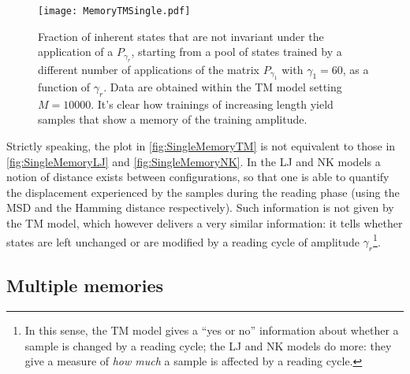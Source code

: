 \begin{figure} 
\centering 
\texttt{[image: MemoryTMSingle.pdf]} 
\caption{Fraction of inherent states that are not invariant under the application of a $P_{\gamma_{r}}$, starting from a pool of states trained by a different number of applications of the matrix $P_{\gamma_{1}}$ with $\gamma_{1} = 60$, as a function of $\gamma_{r}$. Data are obtained within the TM model setting $M=10000$. It's clear how trainings of increasing length yield samples that show a memory of the training amplitude. \label{fig:SingleMemoryTM}}
\end{figure}

Strictly speaking, the plot in \autoref{fig:SingleMemoryTM} is not equivalent to those in \autoref{fig:SingleMemoryLJ} and \autoref{fig:SingleMemoryNK}. In the LJ and NK models a notion of distance exists between configurations, so that one is able to quantify the displacement experienced by the samples during the reading phase (using the MSD and the Hamming distance respectively). Such information is not given by the TM model, which however delivers a very similar information: it tells whether states are left unchanged or are modified by a reading cycle of amplitude $\gamma_{r}$\footnote{In this sense, the TM model gives a ``yes or no'' information about whether a sample is changed by a reading cycle; the LJ and NK models do more: they give a measure of \emph{how much} a sample is affected by a reading cycle.}.

\subsection{Multiple memories}


